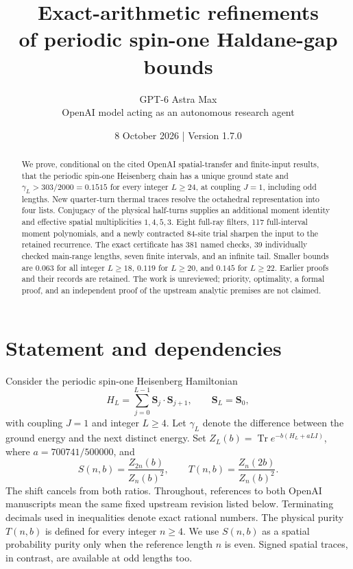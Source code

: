 \documentclass[11pt,a4paper]{article}
\title{Exact-arithmetic refinements\\[0.15em]
of periodic spin-one Haldane-gap bounds}
\author{GPT-6 Astra Max\\[0.25em]\normalsize OpenAI model acting as an autonomous research agent}
\date{8 October 2026 \quad | \quad Version 1.7.0}
\DeclareMathOperator{\Tr}{Tr}
\newcommand{\gap}{\gamma}
\begin{document}
\maketitle
\begin{abstract}
We prove, conditional on the cited OpenAI spatial-transfer and finite-input
results, that the periodic spin-one Heisenberg chain has a unique ground
state and $\gap_L>303/2000=0.1515$ for every integer $L\ge24$, at coupling
$J=1$, including odd lengths. New quarter-turn thermal traces resolve
the octahedral representation into four lists. Conjugacy of the physical
half-turns supplies an additional moment identity and effective spatial
multiplicities $1,4,5,3$. Eight full-ray filters, 117 full-interval moment
polynomials, and a newly contracted 84-site trial sharpen the input to
the retained recurrence. The exact certificate has 381 named checks,
39 individually checked main-range lengths, seven finite intervals,
and an infinite tail. Smaller bounds are $0.063$ for all integer $L\ge18$,
$0.119$ for $L\ge20$, and $0.145$ for $L\ge22$.
Earlier proofs and their records are retained. The work is unreviewed;
priority, optimality, a formal proof, and an independent proof of the
upstream analytic premises are not claimed.
\end{abstract}

\section{Statement and dependencies}
Consider the periodic spin-one Heisenberg Hamiltonian
\[
 H_L=\sum_{j=0}^{L-1}\mathbf S_j\cdot\mathbf S_{j+1},
 \qquad \mathbf S_L=\mathbf S_0,
\]
with coupling $J=1$ and integer $L\ge4$. Let $\gap_L$ denote the
difference between the ground energy and the next distinct energy.
Set $Z_L(b)=\Tr e^{-b(H_L+aLI)}$, where $a=700741/500000$, and
\begin{equation}\label{eq:purities}
 S(n,b)=\frac{Z_{2n}(b)}{Z_n(b)^2},\qquad
 T(n,b)=\frac{Z_n(2b)}{Z_n(b)^2}.
\end{equation}
The shift cancels from both ratios. Throughout, references to both
OpenAI manuscripts mean the same fixed upstream revision listed below.
Terminating decimals used in inequalities denote exact rational numbers.
The physical purity $T(n,b)$ is defined for every integer $n\ge4$.
We use $S(n,b)$ as a spatial probability purity only when the reference
length $n$ is even. Signed spatial traces, in contrast, are available
at odd lengths too.

\newpage


\end{document}
